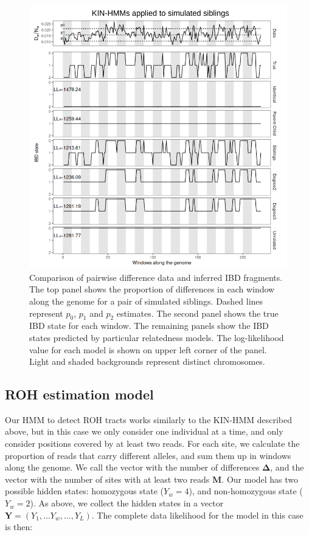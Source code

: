 \documentclass[12pt, letterpaper]{article}
\begin{document}
\begin{figure}[ht!]
    \includegraphics[width=16.5cm]{plots/inkscape_finalImg/IBDplot_title.png}
    \centering
    \caption{Comparison of pairwise difference data and inferred IBD fragments. The top panel shows the proportion of differences in each window along the genome for a pair of simulated siblings. Dashed lines represent $p_0$, $p_1$ and $p_2$ estimates. The second panel shows the true IBD state for each window. The remaining panels show the IBD states predicted by particular relatedness models. The log-likelihood value for each model is shown on upper left corner of the panel. Light and shaded backgrounds represent distinct chromosomes.}
    \label{fig1:ibd}
\end{figure}

\subsection{ROH estimation model}\label{roh}
Our HMM to detect ROH tracts works similarly to the KIN-HMM described above, but in this case we only consider one individual at a time, and only consider positions covered by at least two reads. For each site, we calculate the proportion of reads that carry different alleles, and sum them up in windows along the genome. We call the vector with the number of differences $\mathbf{\Delta}$, and the vector with the number of sites with at least two reads $\mathbf{M}$. Our model has two possible hidden states: homozygous state ($Y_w=4$), and non-homozygous state ($Y_w=2$). As above, we collect the hidden states in a vector $\mathbf{Y} = (Y_1, \dots Y_w, \dots, Y_L)$. The complete data likelihood for the model in this case is then:
\end{document}
